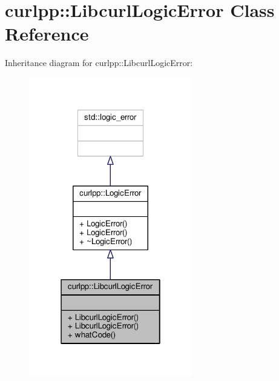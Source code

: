 \hypertarget{classcurlpp_1_1LibcurlLogicError}{\section{curlpp\-:\-:Libcurl\-Logic\-Error Class Reference}
\label{classcurlpp_1_1LibcurlLogicError}
}


Inheritance diagram for curlpp\-:\-:Libcurl\-Logic\-Error\-:
\nopagebreak
\begin{figure}[H]
\begin{center}
\leavevmode
\includegraphics[width=202pt]{classcurlpp_1_1LibcurlLogicError__inherit__graph}
\end{center}
\end{figure}



